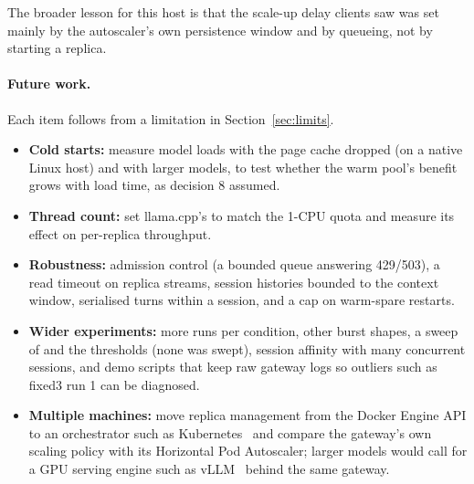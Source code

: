\documentclass[11pt,a4paper]{article}
\DeclareRobustCommand{\code}[1]{\texttt{\detokenize{#1}}}
\begin{document}
The broader lesson for this host is that the scale-up delay clients saw was set mainly by the
autoscaler's own persistence window and by queueing, not by starting a replica.

\paragraph{Future work.} Each item follows from a limitation in Section~\ref{sec:limits}.
\begin{itemize}
  \item \textbf{Cold starts:} measure model loads with the page cache dropped (on a native Linux
        host) and with larger models, to test whether the warm pool's benefit grows with load time,
        as decision 8 assumed.
  \item \textbf{Thread count:} set llama.cpp's \code{-t} to match the 1-CPU quota and measure its
        effect on per-replica throughput.
  \item \textbf{Robustness:} admission control (a bounded queue answering 429/503), a read timeout
        on replica streams, session histories bounded to the context window, serialised turns
        within a session, and a cap on warm-spare restarts.
  \item \textbf{Wider experiments:} more runs per condition, other burst shapes, a sweep of
        \code{scale_up_after_s} and the thresholds (none was swept), session affinity with many
        concurrent sessions, and demo scripts that keep raw gateway logs so outliers such as fixed3
        run 1 can be diagnosed.
  \item \textbf{Multiple machines:} move replica management from the Docker Engine API to an
        orchestrator such as Kubernetes~\cite{k8shpa} and compare the gateway's own scaling policy
        with its Horizontal Pod Autoscaler; larger models would call for a GPU serving engine such
        as vLLM~\cite{vllm} behind the same gateway.
\end{itemize}
\end{document}
